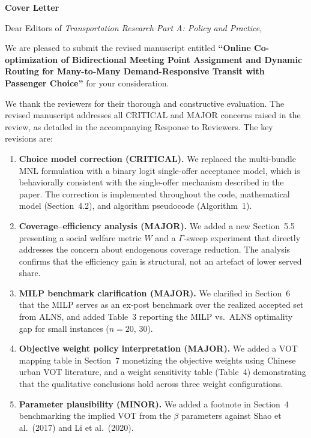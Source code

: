 \documentclass[12pt]{article}
\begin{document}
\noindent
\textbf{Cover Letter}

\bigskip

\noindent
Dear Editors of \textit{Transportation Research Part A: Policy and Practice},

\medskip

We are pleased to submit the revised manuscript entitled \textbf{``Online Co-optimization of Bidirectional Meeting Point Assignment and Dynamic Routing for Many-to-Many Demand-Responsive Transit with Passenger Choice''} for your consideration.

We thank the reviewers for their thorough and constructive evaluation. The revised manuscript addresses all CRITICAL and MAJOR concerns raised in the review, as detailed in the accompanying Response to Reviewers. The key revisions are:

\begin{enumerate}

\item \textbf{Choice model correction (CRITICAL).} We replaced the multi-bundle MNL formulation with a binary logit single-offer acceptance model, which is behaviorally consistent with the single-offer mechanism described in the paper. The correction is implemented throughout the code, mathematical model (Section~4.2), and algorithm pseudocode (Algorithm~1).

\item \textbf{Coverage--efficiency analysis (MAJOR).} We added a new Section~5.5 presenting a social welfare metric $W$ and a $\Gamma$-sweep experiment that directly addresses the concern about endogenous coverage reduction. The analysis confirms that the efficiency gain is structural, not an artefact of lower served share.

\item \textbf{MILP benchmark clarification (MAJOR).} We clarified in Section~6 that the MILP serves as an ex-post benchmark over the realized accepted set from ALNS, and added Table~3 reporting the MILP vs.\ ALNS optimality gap for small instances ($n = 20$, $30$).

\item \textbf{Objective weight policy interpretation (MAJOR).} We added a VOT mapping table in Section~7 monetizing the objective weights using Chinese urban VOT literature, and a weight sensitivity table (Table~4) demonstrating that the qualitative conclusions hold across three weight configurations.

\item \textbf{Parameter plausibility (MINOR).} We added a footnote in Section~4 benchmarking the implied VOT from the $\beta$ parameters against Shao et al.\ (2017) and Li et al.\ (2020).

\end{enumerate}
\end{document}
